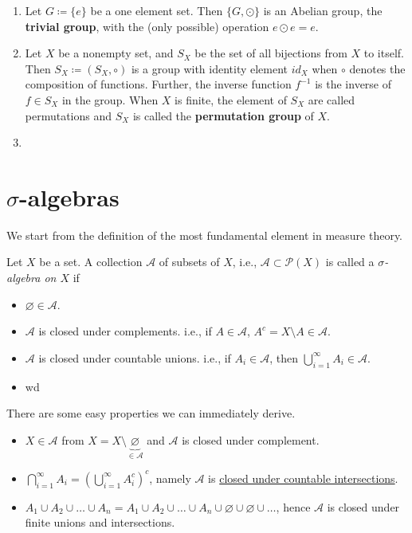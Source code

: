 \begin{eg}
	\begin{enumerate}[label=(\alph*)]
		\item Let \(G \coloneqq \{e\}\) be a one element set. Then \( \{G, \odot\} \) is an Abelian group, the 
		\textbf{trivial group}, with the (only possible) operation \(e \odot e = e\). 
		\item Let \(X\) be a nonempty set, and \(S_X\) be the set of all bijections from \(X\) to itself. 
		Then \(S_X \coloneqq \left(S_X, \circ \right)\) is a group with identity element \(id_X\) when \(\circ\)
		denotes the composition of functions. Further, the inverse function \(f^{-1}\) is the inverse of \(f \in S_X\)
		in the group. When \(X\) is finite, the element of \(S_X\) are called permutations and \(S_X\) is called 
		the \textbf{permutation group} of \(X\).
		\item 
	\end{enumerate}
\end{eg}


\section{\(\sigma\)-algebras}
We start from the definition of the most fundamental element in measure theory.
\begin{definition}\label{def:sigma-algebra}
	Let \(X\) be a set. A collection \(\mathcal{A} \) of subsets of \(X\), i.e., \(\mathcal{A}\subset \mathcal{P} (X) \) is called a \emph{\(\sigma\)-algebra on \(X\)} if
	\begin{itemize}
		\item \(\varnothing \in \mathcal{A} \).
		\item \(\mathcal{A} \) is closed under complements. i.e., if \(A\in \mathcal{A} \), \(A^c = X\setminus A\in \mathcal{A} \).
		\item \(\mathcal{A} \) is closed under countable unions. i.e., if \(A_i\in \mathcal{A} \), then \(\bigcup\limits_{i=1}^{\infty} A_{i}\in \mathcal{A} \).
		\item wd
	\end{itemize}
\end{definition}

\begin{remark}
	There are some easy properties we can immediately derive.
	\begin{itemize}
		\item \(X\in \mathcal{A} \) from \(X = X\setminus \underbrace{\varnothing}_{\in \mathcal{A}} \) and \(\mathcal{A}\) is closed under complement.
		\item \(\bigcap\limits_{i=1}^{\infty} A_{i} = \left(\bigcup\limits_{i=1}^{\infty} A_{i}^{c} \right)^c\), namely \(\mathcal{A} \) is \underline{closed under countable intersections}.
		\item \(A_1\cup A_2 \cup \ldots \cup A_n = A_1\cup A_2 \cup \ldots \cup A_n \cup \varnothing \cup \varnothing \cup\ldots\), hence \(\mathcal{A} \) is closed under finite unions and intersections.
	\end{itemize}
\end{remark}

